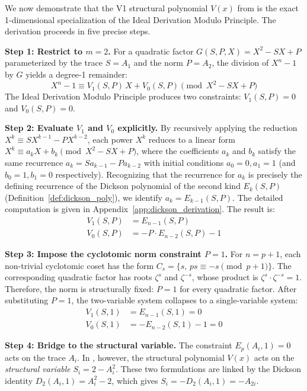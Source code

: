 \documentclass[12pt]{article}
\theoremstyle{plain}
\begin{document}
We now demonstrate that the V1 structural polynomial $V(x)$ from \cite{Wang2026ISIT} is the exact 1-dimensional specialization of the Ideal Derivation Modulo Principle. The derivation proceeds in five precise steps.

\textbf{Step 1: Restrict to $m=2$.} For a quadratic factor $G(S, P, X) = X^2 - SX + P$ parameterized by the trace $S = A_1$ and the norm $P = A_2$, the division of $X^n-1$ by $G$ yields a degree-1 remainder:
\begin{equation}
    X^n - 1 \equiv V_1(S, P)\, X + V_0(S, P) \pmod{X^2 - SX + P}
\end{equation}
The Ideal Derivation Modulo Principle produces two constraints: $V_1(S, P) = 0$ and $V_0(S, P) = 0$.

\textbf{Step 2: Evaluate $V_1$ and $V_0$ explicitly.} By recursively applying the reduction $X^k \equiv S X^{k-1} - P X^{k-2}$, each power $X^k$ reduces to a linear form $X^k \equiv a_k X + b_k \pmod{X^2 - SX + P}$, where the coefficients $a_k$ and $b_k$ satisfy the same recurrence $a_k = S a_{k-1} - P a_{k-2}$ with initial conditions $a_0 = 0, a_1 = 1$ (and $b_0 = 1, b_1 = 0$ respectively). Recognizing that the recurrence for $a_k$ is precisely the defining recurrence of the Dickson polynomial of the second kind $E_k(S, P)$ (Definition~\ref{def:dickson_poly}), we identify $a_k = E_{k-1}(S, P)$. The detailed computation is given in Appendix~\ref{app:dickson_derivation}. The result is:
\begin{align}
    V_1(S, P) &= E_{n-1}(S, P) \\
    V_0(S, P) &= -P \cdot E_{n-2}(S, P) - 1
\end{align}

\textbf{Step 3: Impose the cyclotomic norm constraint $P=1$.} For $n = p+1$, each non-trivial cyclotomic coset has the form $C_s = \{s, \, ps \equiv -s \pmod{p+1}\}$. The corresponding quadratic factor has roots $\zeta^s$ and $\zeta^{-s}$, whose product is $\zeta^s \cdot \zeta^{-s} = 1$. Therefore, the norm is structurally fixed: $P = 1$ for every quadratic factor. After substituting $P = 1$, the two-variable system collapses to a single-variable system:
\begin{align}
    V_1(S, 1) &= E_{n-1}(S, 1) = 0 \\
    V_0(S, 1) &= -E_{n-2}(S, 1) - 1 = 0
\end{align}

\textbf{Step 4: Bridge to the structural variable.} The constraint $E_p(A_i, 1) = 0$ acts on the trace $A_i$. In \cite{Wang2026ISIT}, however, the structural polynomial $V(x)$ acts on the \emph{structural variable} $S_i = 2 - A_i^2$. These two formulations are linked by the Dickson identity $D_2(A_i, 1) = A_i^2 - 2$, which gives $S_i = -D_2(A_i, 1) = -A_{2i}$.
\end{document}
